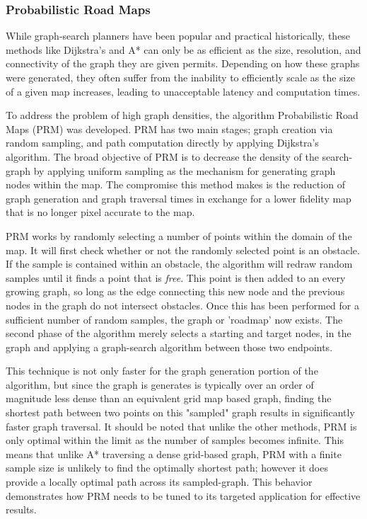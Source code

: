 \subsubsection{Probabilistic Road Maps}

While graph-search planners have been popular and practical historically, these methods like Dijkstra's and A* can only be as efficient as the size, resolution, and connectivity of the graph they are given permits. Depending on how these graphs were generated, they often suffer from the inability to efficiently scale as the size of a given map increases, leading to unacceptable latency and computation times. 

To address the problem of high graph densities, the algorithm Probabilistic Road Maps (PRM) was developed. PRM has two main stages; graph creation via random sampling, and path computation directly by applying Dijkstra's algorithm. The broad objective of PRM is to decrease the density of the search-graph by applying uniform sampling as the mechanism for generating graph nodes within the map. The compromise this method makes is the reduction of graph generation and graph traversal times in exchange for a lower fidelity map that is no longer pixel accurate to the map.

PRM works by randomly selecting a number of points within the domain of the map. It will first check whether or not the randomly selected point is an obstacle. If the sample is contained within an obstacle, the algorithm will redraw random samples until it finds a point that is \textit{free}. This point is then added to an every growing graph, so long as the edge connecting this new node and the previous nodes in the graph do not intersect obstacles. Once this has been performed for a sufficient number of random samples, the graph or 'roadmap' now exists. The second phase of the algorithm merely selects a starting and target nodes, in the graph and applying a graph-search algorithm between those two endpoints.

This technique is not only faster for the graph generation portion of the algorithm, but since the graph is generates is typically over an order of magnitude less dense than an equivalent grid map based graph, finding the shortest path between two points on this "sampled" graph results in significantly faster graph traversal. It should be noted that unlike the other methods, PRM is only optimal within the limit as the number of samples becomes infinite. This means that unlike A* traversing a dense grid-based graph, PRM with a finite sample size is unlikely to find the optimally shortest path; however it does provide a locally optimal path across its sampled-graph. This behavior demonstrates how PRM needs to be tuned to its targeted application for effective results.  

